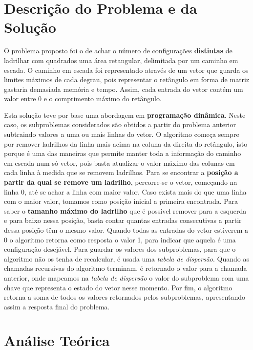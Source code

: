 \documentclass[12pt,a4paper]{article}
\begin{document}
  \section{Descrição do Problema e da Solução}

  O problema proposto foi o de achar o número de configurações \textbf{distintas} de ladrilhar com quadrados uma área retangular, delimitada por um caminho em escada.
  O caminho em escada foi representado através de um vetor que guarda os limites máximos de cada degrau, pois representar o retângulo em forma de matriz gastaria demasiada memória e tempo.
  Assim, cada entrada do vetor contém um valor entre 0 e o comprimento máximo do retângulo.

  Esta solução teve por base uma abordagem em \textbf{programação dinâmica}.
  Neste caso, os subproblemas considerados são obtidos a partir do problema anterior subtraindo valores a uma ou mais linhas do vetor.
  O algoritmo começa sempre por remover ladrilhos da linha mais acima na coluna da direita do retângulo, isto porque é uma das maneiras que permite manter toda a informação do caminho em escada num só vetor, pois basta atualizar o valor máximo das colunas em cada linha à medida que se removem ladrilhos.
  Para se encontrar a \textbf{posição a partir da qual se remove um ladrilho}, percorre-se o vetor, começando na linha 0, até se achar a linha com maior valor.
  Caso exista mais do que uma linha com o maior valor, tomamos como posição inicial a primeira encontrada.
  Para saber o \textbf{tamanho máximo do ladrilho} que é possível remover para a esquerda e para baixo nessa posição, basta contar quantas entradas consecutivas a partir dessa posição têm o mesmo valor.
  Quando todas as entradas do vetor estiverem a 0 o algoritmo retorna como resposta o valor 1, para indicar que aquela é uma configuração desejável.
  Para guardar os valores dos subproblemas, para que o algoritmo não os tenha de recalcular, é usada uma \textit{tabela de dispersão}.
  Quando as chamadas recursivas do algoritmo terminam, é retornado o valor para a chamada anterior, onde mapeamos na \textit{tabela de dispersão} o valor do subproblema com uma chave que representa o estado do vetor nesse momento.
  Por fim, o algoritmo retorna a soma de todos os valores retornados pelos subproblemas, apresentando assim a resposta final do problema.

  \section{Análise Teórica}
\end{document}
